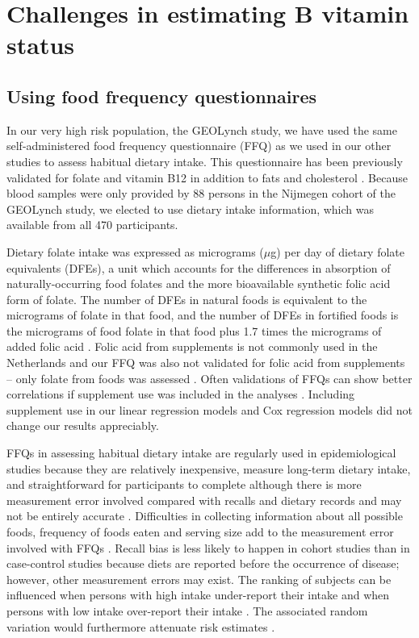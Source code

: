 \section[]{Challenges in estimating B vitamin status} %
\subsection{Using food frequency questionnaires} %
\noindent In our very high risk population, the GEOLynch study, we have used the same self-administered food frequency questionnaire (FFQ) as we used in our other studies to assess habitual dietary intake. This questionnaire has been previously validated for folate and vitamin B12 \cite{c717} in addition to fats and cholesterol \cite{c718}. Because blood samples were only provided by 88 persons in the Nijmegen cohort of the GEOLynch study, we elected to use dietary intake information, which was available from all 470 participants.

\noindent Dietary folate intake was expressed as micrograms ($\mu$g) per day of dietary folate equivalents (DFEs), a unit which accounts for the differences in absorption of naturally-occurring food folates and the more bioavailable synthetic folic acid form of folate. The number of DFEs in natural foods is equivalent to the micrograms of folate in that food, and the number of DFEs in fortified foods is the micrograms of food folate in that food plus 1.7 times the micrograms of added folic acid \cite{c719}. Folic acid from supplements is not commonly used in the Netherlands \cite{c720} and our FFQ was also not validated for folic acid from supplements -- only folate from foods was assessed \cite{c717}. Often validations of FFQs can show better correlations if supplement use was included in the analyses \cite{c721,c722,c723}. Including supplement use in our linear regression models and Cox regression models did not change our results appreciably.

\noindent FFQs in assessing habitual dietary intake are regularly used in epidemiological studies because they are relatively inexpensive, measure long-term dietary intake, and straightforward for participants to complete \cite{c724} although there is more measurement error involved compared with recalls and dietary records and may not be entirely accurate \cite{c725,c726}. Difficulties in collecting information about all possible foods, frequency of foods eaten and serving size add to the measurement error involved with FFQs \cite{c727}. Recall bias is less likely to happen in cohort studies than in case-control studies because diets are reported before the occurrence of disease; however, other measurement errors may exist. The ranking of subjects can be influenced when persons with high intake under-report their intake and when persons with low intake over-report their intake \cite{c728}. The associated random variation would furthermore attenuate risk estimates \cite{c729}.

